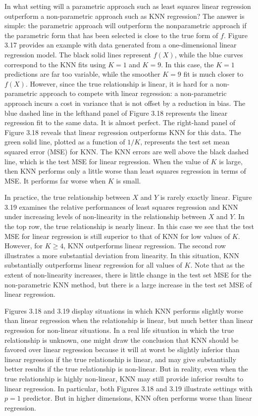 \documentclass[10pt]{article}
\begin{document}
In what setting will a parametric approach such as least squares linear regression outperform a non-parametric approach such as KNN regression? The answer is simple: the parametric approach will outperform the nonparametric approach if the parametric form that has been selected is close to the true form of $f$. Figure 3.17 provides an example with data generated from a one-dimensional linear regression model. The black solid lines represent $f(X)$, while the blue curves correspond to the KNN fits using $K=1$ and $K=9$. In this case, the $K=1$ predictions are far too variable, while the smoother $K=9$ fit is much closer to $f(X)$. However, since the true relationship is linear, it is hard for a non-parametric approach to compete with linear regression: a non-parametric approach incurs a cost in variance that is not offset by a reduction in bias. The blue dashed line in the lefthand panel of Figure 3.18 represents the linear regression fit to the same data. It is almost perfect. The right-hand panel of Figure 3.18 reveals that linear regression outperforms KNN for this data. The green solid line, plotted as a function of $1 / K$, represents the test set mean squared error (MSE) for KNN. The KNN errors are well above the black dashed line, which is the test MSE for linear regression. When the value of $K$ is large, then KNN performs only a little worse than least squares regression in terms of MSE. It performs far worse when $K$ is small.

In practice, the true relationship between $X$ and $Y$ is rarely exactly linear. Figure 3.19 examines the relative performances of least squares regression and KNN under increasing levels of non-linearity in the relationship between $X$ and $Y$. In the top row, the true relationship is nearly linear. In this case we see that the test MSE for linear regression is still superior to that of KNN for low values of $K$. However, for $K \geq 4$, KNN outperforms linear regression. The second row illustrates a more substantial deviation from linearity. In this situation, KNN substantially outperforms linear regression for all values of $K$. Note that as the extent of non-linearity increases, there is little change in the test set MSE for the non-parametric KNN method, but there is a large increase in the test set MSE of linear regression.

Figures 3.18 and 3.19 display situations in which KNN performs slightly worse than linear regression when the relationship is linear, but much better than linear regression for non-linear situations. In a real life situation in which the true relationship is unknown, one might draw the conclusion that KNN should be favored over linear regression because it will at worst be slightly inferior than linear regression if the true relationship is linear, and may give substantially better results if the true relationship is non-linear. But in reality, even when the true relationship is highly non-linear, KNN may still provide inferior results to linear regression. In particular, both Figures 3.18 and 3.19 illustrate settings with $p=1$ predictor. But in higher dimensions, KNN often performs worse than linear regression.
\end{document}
